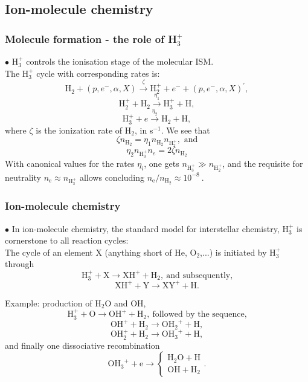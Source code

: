 \subsection{Ion-molecule chemistry}

\begin{frame}\frametitle{Molecule formation - the
role of H$_3^+$}

$\bullet$ H$_3^+$ controls the ionisation stage of the molecular ISM. \\

The  H$_3^+$  cycle with corresponding rates is:
\[ \mathrm{H}_2 + (p,e^-,\alpha,X) \stackrel{\zeta}{\rightarrow}
\mathrm{H}_2^+ + e^- +  (p,e^-,\alpha,X)^\prime, \]
\[ \mathrm{H}_2^+ +   \mathrm{H}_2 \stackrel{\eta_1} {\rightarrow} \mathrm{H}_3^+ + \mathrm{H}, \]
\[ \mathrm{H}_3^+ + e \stackrel{\eta_2}{\rightarrow}    \mathrm{H}_2 +
\mathrm{H}, \]
where $\zeta$ is the ionization rate of H$_2$, in s$^{-1}$. We see that  
\[ \zeta n_{\mathrm{H}_2} = \eta_1 n_{\mathrm{H}_2}
n_{\mathrm{H}^+_2}, \text{~and} \] 
\[ \eta_2 n_{\mathrm{H}_3^+} n_e =  2 \zeta n_{\mathrm{H}_2}   \] 
With canonical values for the rates $\eta_i$, one gets
$n_{\mathrm{H}_3^+} \gg n_{\mathrm{H}_2^+}$, and the requisite for
neutrality $n_\mathrm{e} \approx n_{\mathrm{H}_3^+}$ allows concluding
$n_\mathrm{e} / n_{\mathrm{H}_2} \approx 10^{-8}~$.


\end{frame} \begin{frame}\frametitle{Ion-molecule chemistry}


$\bullet$ In ion-molecule chemistry, the standard model for
interstellar chemistry, H$_3^+$ is cornerstone to all reaction cycles:
\\ 

The cycle of an element X (anything short of He, O$_2$,...)  is 
initiated  by H$_3^+$ through 
\[ \mathrm{H}_3^+ + \mathrm{X} \rightarrow \mathrm{XH^+} + \mathrm{H}_2,~
\text{and subsequently,}\]
\[ \mathrm{XH^+} + \mathrm{Y} \rightarrow \mathrm{XY}^+ + \mathrm{H}
.\]

Example: production of $\mathrm{H_2O}$ and OH, \\
\[ \mathrm{H}_3^+ + \mathrm{O} \rightarrow \mathrm{OH^+} + \mathrm{H}_2,~
\text{followed by the sequence,}\]
\[ \mathrm{OH^+} + \mathrm{H}_2 \rightarrow \mathrm{OH_2}^+ +
\mathrm{H},  \]
\[ \mathrm{OH_2^+} + \mathrm{H}_2 \rightarrow \mathrm{OH_3}^+ +
\mathrm{H}, \]
 and finally one dissociative recombination  
\[ \mathrm{OH_3}^+ + \mathrm{e} \rightarrow \left\{ \begin{array}{l}
  \mathrm{H_2O} + \mathrm{H}\\ \mathrm{OH} + \mathrm{H_2} \end{array} \right. . \]





\end{frame}
